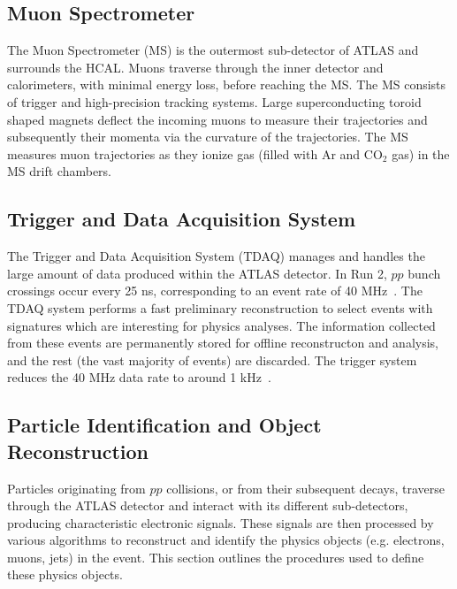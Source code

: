 \subsection{Muon Spectrometer}
The Muon Spectrometer (MS) is the outermost sub-detector of ATLAS and surrounds the HCAL. Muons traverse through the inner detector and calorimeters, with minimal energy loss, before reaching the MS. The MS consists of trigger and high-precision tracking systems. Large superconducting toroid shaped magnets deflect the incoming muons to measure their trajectories and subsequently their momenta via the curvature of the trajectories. The MS measures muon trajectories as they ionize gas (filled with Ar and CO$_{2}$ gas) in the MS drift chambers.

\subsection{Trigger and Data Acquisition System}
The Trigger and Data Acquisition System (TDAQ) manages and handles the large amount of data produced within the ATLAS detector. In Run 2, $pp$ bunch crossings occur every 25 ns, corresponding to an event rate of 40 MHz~\cite{Collaboration_2008}. The TDAQ system performs a fast preliminary reconstruction to select events with signatures which are interesting for physics analyses. The information collected from these events are permanently stored for offline reconstructon and analysis, and the rest (the vast majority of events) are discarded. The trigger system reduces the 40 MHz data rate to around 1 kHz~\cite{Collaboration_2008}.


\subsection{Particle Identification and Object Reconstruction}


Particles originating from $pp$ collisions, or from their subsequent decays, traverse through the ATLAS detector and interact with its different sub-detectors, producing characteristic electronic signals. These signals are then processed by various algorithms to reconstruct and identify the physics objects (e.g. electrons, muons, jets) in the event. This section outlines the procedures used to define these physics objects.

